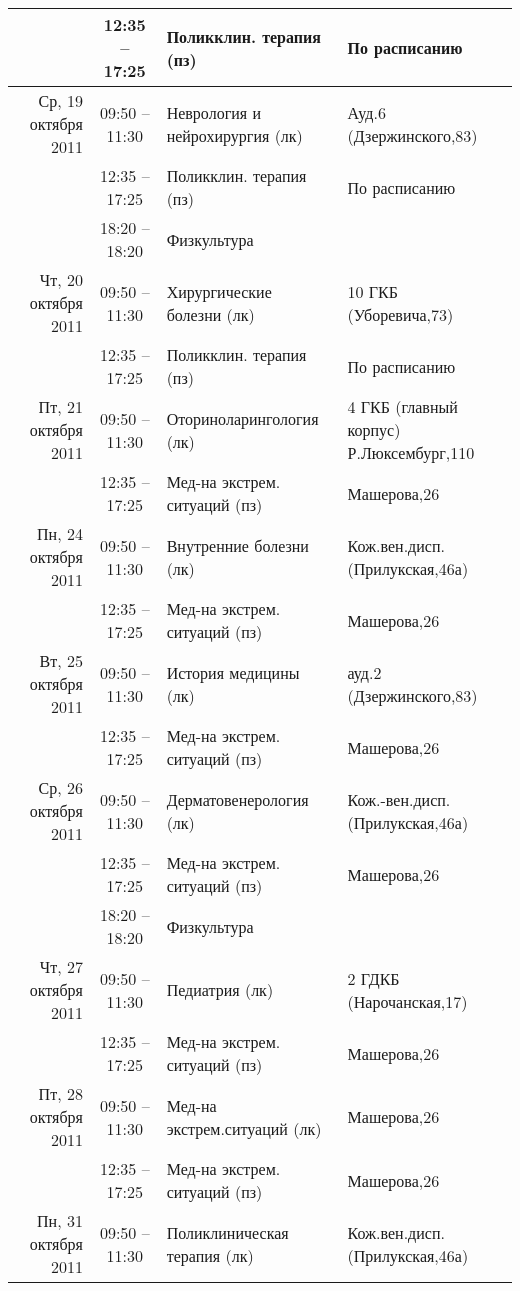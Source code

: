 \documentclass[a4paper,10pt,notitlepage]{report}
\begin{document}
\begin{center}
{\begin{longtable}{r|c|l|l|}
  & 12:35 -- 17:25 & Поликклин. терапия (пз) & По расписанию \\ \cline{2-4}
\hline Ср, 19 октября 2011
  & 09:50 -- 11:30 & Неврология и нейрохирургия (лк) & Ауд.6 (Дзержинского,83) \\ \cline{2-4}
  & 12:35 -- 17:25 & Поликклин. терапия (пз) & По расписанию \\ \cline{2-4}
  & 18:20 -- 18:20 & Физкультура  &  \\ \cline{2-4}
\hline Чт, 20 октября 2011
  & 09:50 -- 11:30 & Хирургические болезни (лк) & 10 ГКБ (Уборевича,73) \\ \cline{2-4}
  & 12:35 -- 17:25 & Поликклин. терапия (пз) & По расписанию \\ \cline{2-4}
\hline Пт, 21 октября 2011
  & 09:50 -- 11:30 & Оториноларингология (лк) & 4 ГКБ (главный корпус) Р.Люксембург,110 \\ \cline{2-4}
  & 12:35 -- 17:25 & Мед-на экстрем. ситуаций (пз) & Машерова,26 \\ \cline{2-4}
\hline Пн, 24 октября 2011
  & 09:50 -- 11:30 & Внутренние болезни (лк) & Кож.вен.дисп.(Прилукская,46а) \\ \cline{2-4}
  & 12:35 -- 17:25 & Мед-на экстрем. ситуаций (пз) & Машерова,26 \\ \cline{2-4}
\hline Вт, 25 октября 2011
  & 09:50 -- 11:30 & История медицины (лк) & ауд.2 (Дзержинского,83) \\ \cline{2-4}
  & 12:35 -- 17:25 & Мед-на экстрем. ситуаций (пз) & Машерова,26 \\ \cline{2-4}
\hline Ср, 26 октября 2011
  & 09:50 -- 11:30 & Дерматовенерология (лк) & Кож.-вен.дисп.(Прилукская,46а) \\ \cline{2-4}
  & 12:35 -- 17:25 & Мед-на экстрем. ситуаций (пз) & Машерова,26 \\ \cline{2-4}
  & 18:20 -- 18:20 & Физкультура  &  \\ \cline{2-4}
\hline Чт, 27 октября 2011
  & 09:50 -- 11:30 & Педиатрия (лк) & 2 ГДКБ (Нарочанская,17) \\ \cline{2-4}
  & 12:35 -- 17:25 & Мед-на экстрем. ситуаций (пз) & Машерова,26 \\ \cline{2-4}
\hline Пт, 28 октября 2011
  & 09:50 -- 11:30 & Мед-на экстрем.ситуаций (лк) & Машерова,26 \\ \cline{2-4}
  & 12:35 -- 17:25 & Мед-на экстрем. ситуаций (пз) & Машерова,26 \\ \cline{2-4}
\hline Пн, 31 октября 2011
  & 09:50 -- 11:30 & Поликлиническая терапия (лк) & Кож.вен.дисп.(Прилукская,46а) \\ \cline{2-4}

\end{longtable}}
\end{center}
\end{document}
